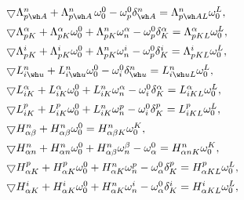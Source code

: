 \begin{equation}


\begin{array}{l}


\bgd\Lambda^n_{p \wh A}+\Lambda^n_{p \wh A}\,\omega^0_0-


\omega^0_p \delta^n_{\wh A}=\Lambda^n_{p \wh A L}\omega^L_0, \\[2mm]


\bgd\Lambda^\alpha_{p K}+\Lambda^\alpha_{p K}\omega^0_0


+\Lambda^n_{p K}\omega^\alpha_n-


\omega^0_p \delta^\alpha_K=\Lambda^\alpha_{p K L}\omega^L_0, \\[2mm]


\bgd\Lambda^i_{p K}+\Lambda^i_{p K}\omega^0_0


+\Lambda^n_{p K}\omega^i_n-


\omega^0_p \delta^i_K=\Lambda^i_{p K L}\omega^L_0, \\[2mm]


\bgd L^n_{i \wh u}+L^n_{i \wh u}\omega^0_0-


\omega^0_i \delta^n_{\wh u}=L^n_{i \wh u L}\omega^L_0, \\[2mm]


\bgd L^\alpha_{i K}+L^\alpha_{i K}\omega^0_0


+L^n_{i K}\omega^\alpha_n-


\omega^0_i \delta^\alpha_K=L^\alpha_{i K L}\omega^L_0, \\[2mm]


\bgd L^p_{i K}+L^p_{i K}\omega^0_0


+L^n_{i K}\omega^p_n-


\omega^0_i \delta^p_K=L^p_{i K L}\omega^L_0, \\[2mm]


\bgd H^n_{\alpha \beta}+H^n_{\alpha \beta}\omega^0_0


=H^n_{\alpha \beta K}\omega^K_0, \\[2mm]


\bgd H^n_{\alpha n}+H^n_{\alpha n}\omega^0_0


+H^n_{\alpha \beta}\omega^\beta_n-


\omega^0_\alpha=H^n_{\alpha n K}\omega^K_0, \\[2mm]


\bgd H^p_{\alpha K}+H^p_{\alpha K}\omega^0_0


+H^n_{\alpha K}\omega^p_n-


\omega^0_\alpha \delta^p_K=H^p_{\alpha K L}\omega^L_0, \\[2mm]


\bgd H^i_{\alpha K}+H^i_{\alpha K}\omega^0_0


+H^n_{\alpha K}\omega^i_n-


\omega^0_\alpha \delta^i_K=H^i_{\alpha K L}\omega^L_0,


\end{array}


\end{equation}


